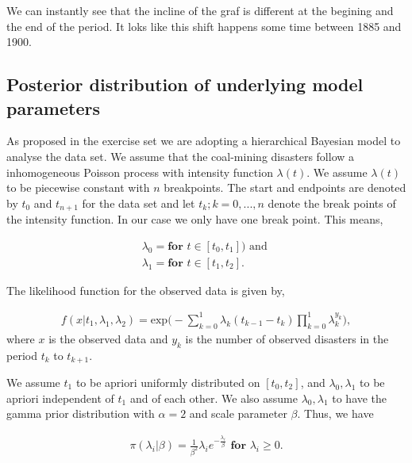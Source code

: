 We can instantly see that the incline of the graf is different at the begining and the end of the period. It loks like this shift happens some time between 1885 and 1900. 


\subsection{Posterior distribution of underlying model parameters} \label{posterior}

As proposed in the exercise set we are adopting a hierarchical Bayesian model to analyse the data set. We assume that the coal-mining disasters follow a inhomogeneous Poisson process with intensity function $\lambda(t)$. We assume $\lambda(t)$ to be piecewise constant with $n$ breakpoints. The start and endpoints are denoted by $t_0$ and $t_{n+1}$ for the data set and let $t_k; k = 0,...,n$ denote the break points of the intensity function. In our case we only have one break point. This means,  

\begin{align}
    \lambda_0 = \textbf{for } t \in [t_0,t_{1}]) \text{ and }\\
    \lambda_1 = \textbf{for } t \in [t_1, t_2].
\end{align}

The likelihood function for the observed data is given by,

\begin{align}
    f(x|t_1,\lambda_1,\lambda_2) 
    = \text{exp} \Big( - \sum_{k = 0}^1 \lambda_k (t_{k-1} - t_k) \prod_{k = 0}^1 \lambda_k^{y_k} \Big), 
\end{align}
where $x$ is the observed data and $y_k$ is the number of observed disasters in the period $t_k$ to $t_{k+1}$. 

We assume $t_1$ to be apriori uniformly distributed on $[t_0, t_2]$, and $\lambda_0, \lambda_1$ to be apriori independent of $t_1$ and of each other. We also assume $\lambda_0,\lambda_1$ to have the gamma prior distribution with $\alpha = 2$ and scale parameter $\beta$. Thus, we have 

\begin{align}
    \pi(\lambda_i | \beta) = \frac{1}{\beta^2}\lambda_i e^{-\frac{\lambda_i}{\beta}} \textbf{ for } \lambda_i \geq 0.
\end{align}

